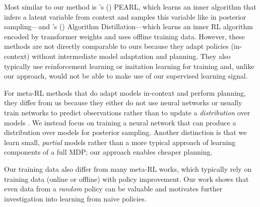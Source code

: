 \documentclass[sigconf]{aamas}
\begin{document}
Most similar to our method is \citeauthor{rakellyEfficientOffPolicyMetaReinforcement2019}'s (\citeyear{rakellyEfficientOffPolicyMetaReinforcement2019}) PEARL, which learns an inner algorithm that infers a latent variable from context and samples this variable like in posterior sampling---and \citeauthor{laskinIncontextReinforcementLearning2022}'s (\citeyear{laskinIncontextReinforcementLearning2022}) Algorithm Distillation---which learns an inner RL algorithm encoded by transformer weights and uses offline training data. However, these methods \citep[along with others like:][]{wangLearningReinforcementLearn2016,duanRLFastReinforcement2016,zintgrafVariBADVariationalBayesAdaptive2021} are not directly comparable to ours because they adapt policies (in-context) without intermediate model adaptation and planning. They also typically use reinforcement learning or imitation learning for training and, unlike our approach, would not be able to make use of our supervised learning signal.


For meta-RL methods that do adapt models in-context and perform planning, they differ from us because they either do not use neural networks \citep[e.g.,][]{saemundssonMetaReinforcementLearning2018} or usually train networks to predict observations rather than to update a \textit{distribution} over models \citep[e.g.,][]{nagabandiLearningAdaptDynamic2019,weinsteinStructureLearningMotor2017}. We instead focus on training a neural network that can produce a distribution over models for posterior sampling. Another distinction is that we learn small, \textit{partial} models rather than a more typical approach of learning components of a full MDP; our approach enables cheaper planning.



Our training data also differ from many meta-RL works, which typically rely on training data (online or offline) with policy improvement. Our work shows that even data from a \textit{random} policy can be valuable and motivates further investigation into learning from naive policies.
\end{document}

